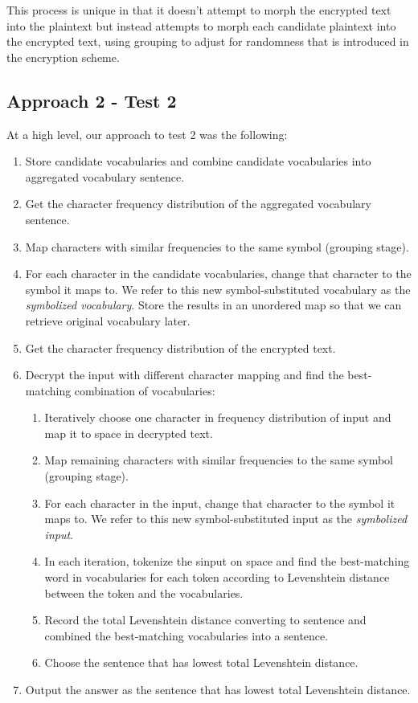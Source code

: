 \documentclass[12pt]{article}
\begin{document}
This process is unique in that it doesn't attempt to morph the encrypted text into the plaintext but instead attempts to morph each candidate plaintext into the encrypted text, using grouping to adjust for randomness that is introduced in the encryption scheme.

\subsection{Approach 2 - Test 2}
At a high level, our approach to test 2 was the following:
\begin{enumerate}

    \item Store candidate vocabularies and combine candidate vocabularies into aggregated vocabulary sentence.
    \item Get the character frequency distribution of the aggregated vocabulary sentence.
    \item Map characters with similar frequencies to the same symbol (grouping stage).
    \item For each character in the candidate vocabularies, change that character to the symbol it maps to. We refer to this new symbol-substituted vocabulary as the \emph{symbolized vocabulary}. Store the results in an unordered map so that we can retrieve original vocabulary later.
    \item Get the character frequency distribution of the encrypted text.
    \item Decrypt the input with different character mapping and find the best-matching combination of vocabularies:
    \begin{enumerate}
        \item Iteratively choose one character in frequency distribution of input and map it to space in decrypted text.
        \item Map remaining characters with similar frequencies to the same symbol (grouping stage).
        \item For each character in the input, change that character to the symbol it maps to. We refer to this new symbol-substituted input as the \emph{symbolized input}.
        \item In each iteration, tokenize the sinput on space and find the best-matching word in vocabularies for each token according to Levenshtein distance between the token and the vocabularies.
        \item Record the total Levenshtein distance converting to sentence and combined the best-matching vocabularies into a sentence.
        \item Choose the sentence that has lowest total Levenshtein distance.
    \end{enumerate}
    \item Output the answer as the sentence that has lowest total Levenshtein distance.

\end{enumerate}
\end{document}
